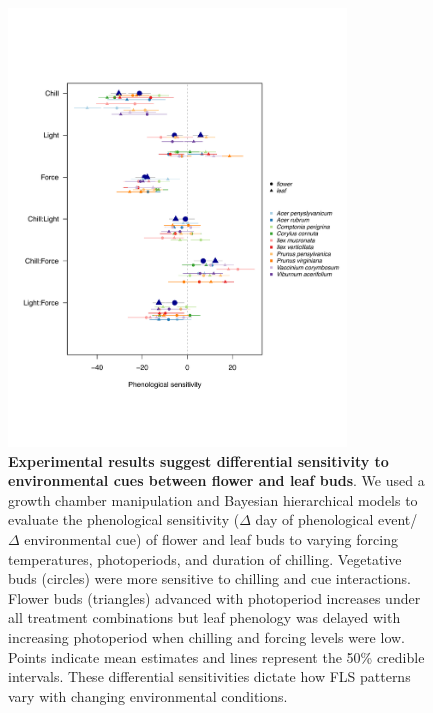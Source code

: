 \documentclass[11pt]{article}\usepackage[]{graphicx}\usepackage[]{color}
\begin{document}
\begin{figure}[h!]
    \label{fig:simulations}
\end{figure}
\pagebreak


\begin{figure}[h!]
    \centering
         \includegraphics[width=0.8\textwidth]{..//Plots/Flobuds_manuscript_figs/budburstvsflowering.pdf}
    \caption{\textbf{Experimental results suggest differential sensitivity to environmental cues between flower and leaf buds}. We used a growth chamber manipulation and Bayesian hierarchical models to evaluate the phenological sensitivity ($\Delta$ day of phenological event/ $\Delta$ environmental cue) of flower and leaf buds to varying forcing temperatures, photoperiods, and duration of chilling.   Vegetative buds (circles) were more sensitive to chilling and cue interactions. Flower buds (triangles) advanced with photoperiod increases under all treatment combinations but leaf phenology was delayed with increasing photoperiod when chilling and forcing levels were low. Points indicate mean estimates and lines represent the 50\% credible intervals. These differential sensitivities dictate how FLS patterns vary with changing environmental conditions.}
    \label{fig:model}
\end{figure}
\end{document}

